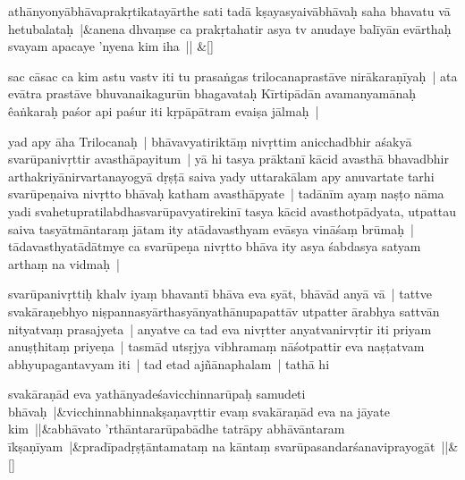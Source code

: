 \documentclass[article,12pt,a4paper]{memoir}%
\newcommand{\persName}[1]{#1}
\newcounter{parCount}
\begin{document}
	    
	    \stanza[\smallbreak]
	  athānyonyābhāvaprakṛtikatayārthe sati tadā kṣayasyaivābhāvaḥ saha bhavatu vā hetubalataḥ |&anena dhvaṃse ca prakṛtahatir asya tv anudaye balīyān evārthaḥ svayam apacaye 'nyena kim iha || \&[\smallbreak]
	  
	  
	  

	  
	  \pstart \leavevmode%
	\label{thakur75-121.17}sac cāsac ca kim astu vastv iti tu prasaṅgas \persName{trilocana}prastāve nirākaraṇīyaḥ | ata evātra prastāve bhuvanaikagurūn bhagavataḥ Kīrtipādān avamanyamānaḥ êaṅkaraḥ paśor api paśur iti kṛpāpātram evaiṣa jālmaḥ |
	{}
	\pend%
      

	  
	  \pstart \leavevmode%
	\label{thakur75-121.20}yad apy āha \persName{Trilocanaḥ} | bhāvavyatiriktāṃ nivṛttim anicchadbhir aśakyā svarūpanivṛttir avasthāpayitum | yā hi tasya prāktanī kācid avasthā bhavadbhir arthakriyānirvartanayogyā dṛṣṭā saiva yady uttarakālam apy anuvartate tarhi svarūpeṇaiva nivṛtto bhāvaḥ katham avasthāpyate | tadānīm ayaṃ naṣṭo nāma yadi svahetupratilabdhasvarūpavyatirekinī tasya kācid avasthotpādyata, utpattau saiva tasyātmāntaraṃ jātam ity atādavasthyam evāsya vināśaṃ brūmaḥ | tādavasthyatādātmye ca svarūpeṇa nivṛtto bhāva ity asya śabdasya satyam arthaṃ na vidmaḥ |
	{}
	\pend%
      

	  
	  \pstart \leavevmode%
	\label{thakur75-121.26}svarūpanivṛttiḥ khalv iyaṃ bhavantī bhāva eva syāt, bhāvād anyā vā | tattve svakāraṇebhyo niṣpannasyārthasyānyathānupapattāv utpatter ārabhya sattvān nityatvaṃ prasajyeta | anyatve ca tad eva nivṛtter anyatvanirvṛtir iti priyam anuṣṭhitaṃ priyeṇa | tasmād utsṛjya vibhramaṃ nāśotpattir eva naṣṭatvam abhyupagantavyam iti | \label{thakur75-122.1} tad etad ajñānaphalam | tathā hi
	{}
	\pend%
      
	    
	    \stanza[\smallbreak]
	  svakāraṇād eva yathānyadeśavicchinnarūpaḥ samudeti bhāvaḥ |&vicchinnabhinnakṣaṇavṛttir evaṃ svakāraṇād eva na jāyate kim ||&abhāvato 'rthāntararūpabādhe tatrāpy abhāvāntaram īkṣaṇīyam |&pradīpadṛṣṭāntamataṃ na kāntaṃ svarūpasandarśanaviprayogāt ||\&[\smallbreak]
	  
\end{document}

